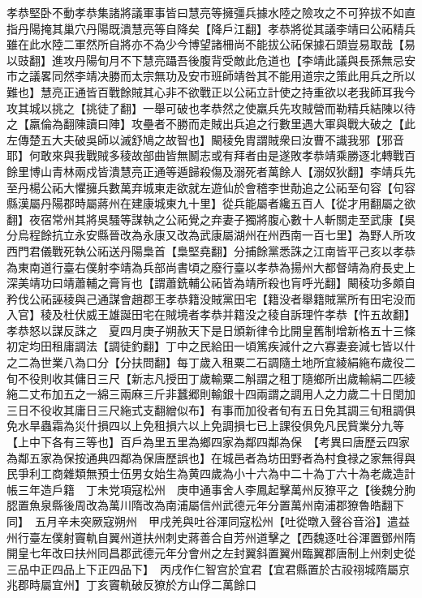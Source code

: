 孝恭堅卧不動孝恭集諸將議軍事皆曰慧亮等擁彊兵據水陸之險攻之不可猝拔不如直指丹陽掩其巢穴丹陽既潰慧亮等自降矣【降戶江翻】孝恭將從其議李靖曰公祏精兵雖在此水陸二軍然所自將亦不為少今博望諸柵尚不能拔公祏保據石頭豈易取哉【易以豉翻】進攻丹陽旬月不下慧亮躡吾後腹背受敵此危道也【李靖此議與長孫無忌安市之議畧同然李靖决勝而太宗無功及安市班師靖咎其不能用道宗之策此用兵之所以難也】慧亮正通皆百戰餘賊其心非不欲戰正以公祏立計使之持重欲以老我師耳我今攻其城以挑之【挑徒了翻】一舉可破也孝恭然之使羸兵先攻賊營而勒精兵結陳以待之【羸倫為翻陳讀曰陣】攻壘者不勝而走賊出兵追之行數里遇大軍與戰大破之【此左傳楚五大夫破吳師以滅舒鳩之故智也】闞稜免胄謂賊衆曰汝曹不識我邪【邪音耶】何敢來與我戰賊多稜故部曲皆無鬭志或有拜者由是遂敗孝恭靖乘勝逐北轉戰百餘里博山青林兩戍皆潰慧亮正通等遁歸殺傷及溺死者萬餘人【溺奴狄翻】李靖兵先至丹楊公祏大懼擁兵數萬弃城東走欲就左遊仙於會稽李世勣追之公祏至句容【句容縣漢屬丹陽郡時屬蔣州在建康城東九十里】從兵能屬者纔五百人【從才用翻屬之欲翻】夜宿常州其將吳騷等謀執之公祏覺之弃妻子獨將腹心數十人斬關走至武康【吳分烏程餘抗立永安縣晉改為永康又改為武康屬湖州在州西南一百七里】為野人所攻西門君儀戰死執公祏送丹陽梟首【梟堅堯翻】分捕餘黨悉誅之江南皆平己亥以孝恭為東南道行臺右僕射李靖為兵部尚書頃之廢行臺以孝恭為揚州大都督靖為府長史上深美靖功曰靖蕭輔之膏肓也【謂蕭銑輔公祏皆為靖所殺也肓呼光翻】闞稜功多頗自矜伐公祏誣稜與己通謀會趙郡王孝恭籍没賊黨田宅【籍没者舉籍賊黨所有田宅没而入官】稜及杜伏威王雄誕田宅在賊境者孝恭并籍没之稜自訴理忤孝恭【忤五故翻】孝恭怒以謀反誅之　夏四月庚子朔赦天下是日頒新律令比開皇舊制增新格五十三條　初定均田租庸調法【調徒釣翻】丁中之民給田一頃篤疾減什之六寡妻妾減七皆以什之二為世業八為口分【分扶問翻】每丁歲入租粟二石調隨土地所宜綾絹絁布歲役二旬不役則收其傭日三尺【新志凡授田丁歲輸粟二斛謂之租丁隨鄉所出歲輸絹二匹綾絁二丈布加五之一綿三兩麻三斤非蠶郷則輸銀十四兩謂之調用人之力歲二十日閏加三日不役收其庸日三尺絁式支翻繒似布】有事而加役者旬有五日免其調三旬租調俱免水旱蟲霜為災什損四以上免租損六以上免調損七已上課役俱免凡民貲業分九等【上中下各有三等也】百戶為里五里為鄉四家為鄰四鄰為保　【考異曰唐歷云四家為鄰五家為保按通典四鄰為保唐歷誤也】在城邑者為坊田野者為村食禄之家無得與民爭利工商雜類無預士伍男女始生為黄四歲為小十六為中二十為丁六十為老歲造計帳三年造戶籍　丁未党項寇松州　庚申通事舍人李鳳起擊萬州反獠平之【後魏分朐䏰置魚泉縣後周改為萬川隋改為南浦屬信州武德元年分置萬州南浦郡獠魯皓翻下同】　五月辛未突厥寇朔州　甲戌羌與吐谷渾同寇松州【吐從暾入聲谷音浴】遣益州行臺左僕射竇軌自翼州道扶州刺史蔣善合自芳州道擊之【西魏逐吐谷渾置鄧州隋開皇七年改曰扶州同昌郡武德元年分會州之左封翼斜置翼州臨翼郡唐制上州刺史從三品中正四品上下正四品下】　丙戌作仁智宫於宜君【宜君縣置於古祋祤城隋屬京兆郡時屬宜州】丁亥竇軌破反獠於方山俘二萬餘口

